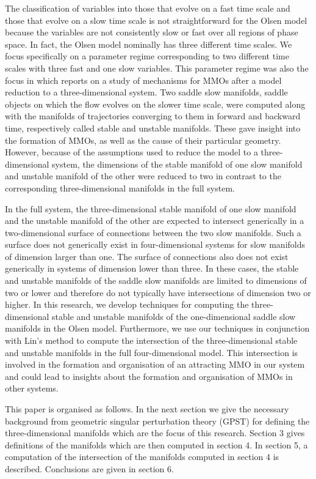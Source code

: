 \documentclass{ws-ijbc}
\begin{document}
The classification of variables into those that evolve on a fast time scale and those that evolve on a slow time scale is not straightforward for the Olsen model because the variables are not consistently slow or fast over all regions of phase space.  In fact, the Olsen model nominally has three different time scales.  We focus specifically on a parameter regime corresponding to two different time scales with three fast and one slow variables.  This parameter regime was also the focus in \cite{QSSA} which reports on a study of mechanisms for MMOs after a model reduction to a three-dimensional system.  Two saddle slow manifolds, saddle objects on which the flow evolves on the slower time scale, were computed along with the manifolds of trajectories converging to them in forward and backward time, respectively called stable and unstable manifolds.  These gave insight into the formation of MMOs, as well as the cause of their particular geometry.  However, because of the assumptions used to reduce the model to a three-dimensional system, the dimensions of the stable manifold of one slow manifold and unstable manifold of the other were reduced to two in contrast to the corresponding three-dimensional manifolds in the full system.  

In the full system, the three-dimensional stable manifold of one slow manifold and the unstable manifold of the other are expected to intersect generically in a two-dimensional surface of connections between the two slow manifolds.  Such a surface does not generically exist in four-dimensional systems for slow manifolds of dimension larger than one.  The surface of connections also does not exist generically in systems of dimension lower than three.  In these cases, the stable and unstable manifolds of the saddle slow manifolds are limited to dimensions of two or lower and therefore do not typically have intersections of dimension two or higher.  In this research, we develop techniques for computing the three-dimensional stable and unstable manifolds of the one-dimensional saddle slow manifolds in the Olsen model.  Furthermore, we use our techniques in conjunction with Lin's method to compute the intersection of the three-dimensional stable and unstable manifolds in the full four-dimensional model.  This intersection is involved in the formation and organisation of an attracting MMO in our system and could lead to insights about the formation and organisation of MMOs in other systems.

This paper is organised as follows.  In the next section we give the necessary background from geometric singular perturbation theory (GPST) for defining the three-dimensional manifolds which are the focus of this research.  Section 3 gives definitions of the manifolds which are then computed in section 4.  In section 5, a computation of the intersection of the manifolds computed in section 4 is described.  Conclusions are given in section 6.
\end{document}
